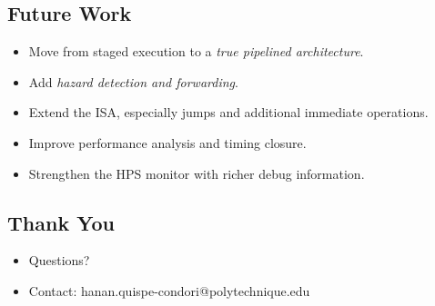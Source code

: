 \documentclass[11pt]{article}
\begin{document}
\subsection*{Future Work}
\label{sec:org1b6c2a9}
\begin{itemize}
\item Move from staged execution to a \emph{true pipelined architecture}.
\item Add \emph{hazard detection and forwarding}.
\item Extend the ISA, especially jumps and additional immediate operations.
\item Improve performance analysis and timing closure.
\item Strengthen the HPS monitor with richer debug information.
\end{itemize}
\subsection*{Thank You}
\label{sec:org5735b75}
\begin{itemize}
\item Questions?
\item Contact: hanan.quispe-condori@polytechnique.edu
\end{itemize}
\end{document}
